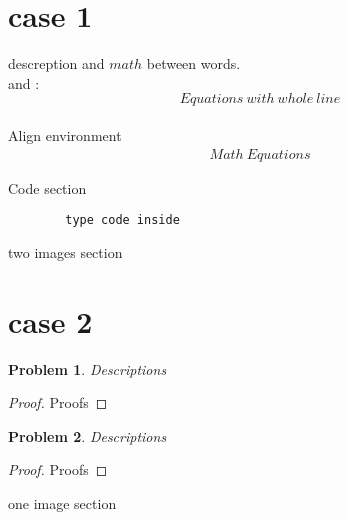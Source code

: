 \documentclass[12pt]{article}
\newtheorem{problem}{Problem}
\begin{document}
 

\rhead{\today}
 
\section*{case 1}
    descreption and $math$ between words. \\
    and :\\
       $$ 
        Equations\ with\ whole\ line 
       $$
    \\
    Align environment
    \begin{align*}
    Math\ Equations
    \end{align*}

    Code section
    \begin{lstlisting}
        type code inside
    \end{lstlisting}

    two images section


    \section*{case 2}
    \begin{problem} 
        Descriptions
    \end{problem}

    \begin{proof}
        Proofs
    \end{proof}

    \begin{problem} 
        Descriptions
    \end{problem}
    \begin{proof} 
        Proofs
    \end{proof}

    one image section

    
\end{document}
